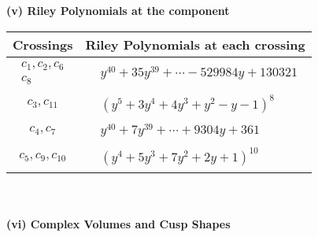 \documentclass[1p]{elsarticle_modified}
\theoremstyle{definition}
\begin{document}
\newpage\renewcommand{\arraystretch}{1}
\flushleft \textbf{(v) Riley Polynomials at the component}\newline \\
\begin{tabular}{m{50pt}|m{274pt}}
Crossings & \hspace{64pt}Riley Polynomials at each crossing \\
\hline $$\begin{aligned}c_{1},c_{2},c_{6}\\c_{8}\end{aligned}$$&$\begin{aligned}
&y^{40}+35 y^{39}+\cdots-529984 y+130321
\end{aligned}$\\
\hline $$\begin{aligned}c_{3},c_{11}\end{aligned}$$&$\begin{aligned}
&(y^5+3 y^4+4 y^3+y^2- y-1)^8
\end{aligned}$\\
\hline $$\begin{aligned}c_{4},c_{7}\end{aligned}$$&$\begin{aligned}
&y^{40}+7 y^{39}+\cdots+9304 y+361
\end{aligned}$\\
\hline $$\begin{aligned}c_{5},c_{9},c_{10}\end{aligned}$$&$\begin{aligned}
&(y^4+5 y^3+7 y^2+2 y+1)^{10}
\end{aligned}$\\
\hline
\end{tabular}\\~\\
\newpage\flushleft \textbf{(vi) Complex Volumes and Cusp Shapes}
\end{document}
